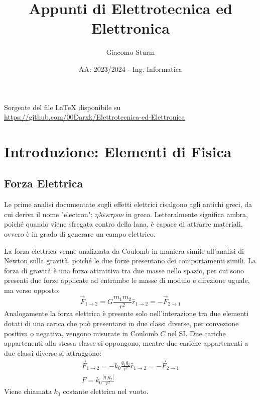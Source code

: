 \documentclass{article}
\title{Appunti di Elettrotecnica ed Elettronica}
\author{Giacomo Sturm}
\date{AA: 2023/2024 - Ing. Informatica}
\numberwithin{equation}{subsection}
\begin{document}
\maketitle

\vspace{10mm}

\begin{center}
    Sorgente del file LaTeX disponibile su \url{https://github.com/00Darxk/Elettrotecnica-ed-Elettronica}
\end{center}

\clearpage

\tableofcontents

\clearpage

\section{Introduzione: Elementi di Fisica}

\subsection{Forza Elettrica}
Le prime analisi documentate sugli effetti elettrici risalgono agli antichi greci, da cui deriva il nome "electron"; $\eta\lambda\varepsilon\kappa\tau\rho o\nu$ in greco. Letteralmente significa ambra, poiché 
quando viene sfregata contro della lana, è capace di attrarre materiali, ovvero è in grado di generare un campo elettrico.

La forza elettrica venne analizzata da Coulomb in maniera simile all'analisi di Newton sulla gravità, poiché le due forze presentano dei comportamenti simili. La forza di 
gravità è una forza attrattiva tra due masse nello spazio, per cui sono presenti due forze applicate ad entrambe le masse di modulo e direzione uguale, ma verso opposto: 
\begin{equation*}
    \vec{F}_{1\to2}=G\displaystyle\frac{m_1m_2}{r^2}\hat{r}_{1\to2}=-\vec{F}_{2\to1}
\end{equation*}
Analogamente la forza elettrica è presente solo nell'interazione tra due elementi dotati di una carica che può presentarsi in due classi diverse, per convezione 
positiva o negativa, vengono misurate in Coulomb $C$ nel SI. Due cariche appartenenti alla stessa classe si oppongono, mentre due cariche appartenenti a due classi diverse 
si attraggono:
\begin{gather}
    \vec{F}_{1\to2}=-k_0\displaystyle\frac{q_1q_2}{r^2}\hat{r}_{1\to2}=-\vec{F}_{2\to1}\\
    F=k_0\displaystyle\frac{|q_1q_2|}{r^2}
\end{gather} 
Viene chiamata $k_0$ costante elettrica nel vuoto. 
\end{document}
